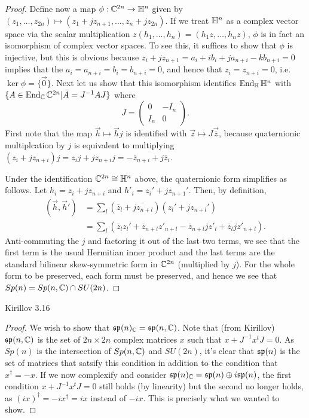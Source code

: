 \documentclass{../../mathnotes}
\begin{document}
\begin{proof}
    Define now a map $\phi:\mathbb{C}^{2n}\to\mathbb{H}^n$ given by $(z_1,\ldots, z_{2n})\mapsto(z_1+jz_{n+1},\ldots,z_n+jz_{2n})$. If we treat $\mathbb{H}^n$ as a complex vector
    space via the scalar multiplication $z(h_1,\ldots,h_n)=(h_1z,\ldots,h_nz)$, $\phi$ is in fact an isomorphism of complex vector spaces. To see this, it suffices
    to show that $\phi$ is injective, but this is obvious because $z_i+jz_{n+1}=a_i+ib_i+ja_{n+i}-kb_{n+i}=0$ implies that the $a_i=a_{n+i}=b_i=b_{n+i}=0$,
    and hence that $z_i=z_{n+i}=0$, i.e. $\ker\phi=\{\vec 0\}$. Next let us show that this isomorphism identifies $\operatorname{End}_{\mathbb{H}}\mathbb{H}^n$ with
    $\{A\in\operatorname{End}_{\mathbb{C}}\mathbb{C}^{2n} | \bar A=J^{-1}AJ\}$ where
    \[J=\begin{pmatrix}0&-I_n\\I_n&0\end{pmatrix}.\]
    First note that the map $\vec h\mapsto\vec hj$ is identified with $\vec z\mapsto J\vec{\bar z}$, because quaternionic multiplcation by $j$ is equivalent
    to multiplying $(z_i+jz_{n+i})j=z_ij+jz_{n+i}j=-\bar z_{n+i}+j\bar z_i$.

    Under the identification $\mathbb{C}^{2n}\cong\mathbb{H}^n$ above, the quaternionic form simplifies as follows. Let $h_i=z_i+jz_{n+i}$ and $h'_i=z_i'+jz_{n+1}'$.
    Then, by definition,
    \begin{align*}
        (\vec h,\vec h')&=\sum_l (\bar z_l+\overline{jz_{n+l}})(z_l'+jz_{n+l}')\\
        &=\sum_l\left( \bar z_lz_l'+\bar z_{n+l}z'_{n+l}-\bar z_{n+l}jz'_l+\bar z_l j z'_{n+l} \right).
    \end{align*}
    Anti-commuting the $j$ and factoring it out of the last two terms, we see that the first term is the usual Hermitian inner product and the last terms
    are the standard bilinear skew-symmetric form in $\mathbb{C}^{2n}$ (multiplied by $j$). For the whole form to be preserved, each form must be preserved, and hence
    we see that $Sp(n)=Sp(n,\mathbb{C})\cap SU(2n)$.

\end{proof}

\begin{prop}
    Kirillov 3.16
\end{prop}
\begin{proof}
    We wish to show that $\mathfrak{sp}(n)_{\mathbb{C}}=\mathfrak{sp}(n,\mathbb{C})$. Note that (from Kirillov) $\mathfrak{sp}(n,\mathbb{C})$ is the set of $2n\times 2n$ complex matrices $x$ such that $x+J^{-1}x^tJ=0$.
    As $Sp(n)$ is the intersection of $Sp(n,\mathbb{C})$ and $SU(2n)$, it's clear that $\mathfrak{sp}(n)$ is the set of matrices that satsify this condition in addition
    to the condition that $x^\dagger=-x$. If we now complexify and consider $\mathfrak{sp}(n)_{\mathbb{C}}=\mathfrak{sp}(n)\oplus i\mathfrak{sp}(n)$, the first condition $x+J^{-1}x^tJ=0$
    still holds (by linearity) but the second no longer holds, as $(ix)^\dagger=-ix^\dagger=ix$ instead of $-ix$. This is precisely what we wanted to show.
\end{proof}
\end{document}
